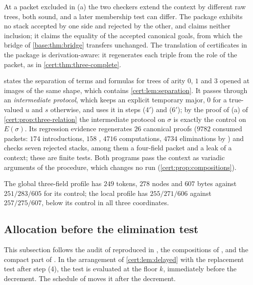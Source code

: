 At a packet excluded in (a) the two checkers extend the context by different
raw trees, both sound, and a later membership test can differ. The package
exhibits no stack accepted by one side and rejected by the other, and claims
neither inclusion; it claims the equality of the accepted canonical goals,
from which the bridge of \cref{base:thm:bridge} transfers unchanged.
The translation of certificates in the package is derivation-aware: it
regenerates each triple from the role of the packet, as in
\cref{cert:thm:three-complete}.

\begin{remark}\label{cert:rem:three-sources}
 states the separation of terms and formulas for trees of
arity $0$, $1$ and $3$ opened at images of the same shape, which contains
\cref{cert:lem:separation}. It passes through an \emph{intermediate protocol},
which keeps an explicit temporary major, $0$ for a true-valued $u$ and $s$
otherwise, and uses it in steps (4$'$) and (6$'$); by the proof of (a) of
\cref{cert:prop:three-relation} the intermediate protocol on $\sigma$ is
exactly the control on $E(\sigma)$. Its regression evidence
regenerates $26$ canonical proofs ($9782$ consumed packets: $174$
introductions, $158$ , $4716$ computations, $4734$ eliminations
by ) and checks seven rejected stacks, among them a four-field
packet and a leak of a context; these are finite tests. Both programs pass
the context as variadic arguments of the procedure, which changes no run
(\cref{cert:prop:compositions}).
\end{remark}

The global three-field profile has $249$ tokens, $278$ nodes and $607$ bytes
against $251/283/605$ for its control; the local profile has $255/271/606$
against $257/275/607$, below its control in all three coordinates.

\subsection{Allocation before the elimination test}\label{cert:sec:context-first}

This subsection follows the audit of  reproduced in
, the compositions of , and the compact
part of . In the arrangement of \cref{cert:lem:delayed} with
the replacement test after step (4), the test is evaluated at the floor $k$,
immediately before the decrement. The schedule of  moves
it after the decrement.

